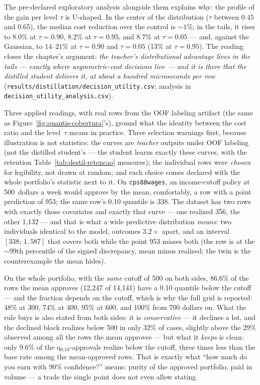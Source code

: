 The pre-declared exploratory analysis alongside them explains why: the
profile of the gain per level $\tau$ is U-shaped. In the center of
the distribution ($\tau$ between 0.45 and 0.65), the median cost
reduction over the control is ${\sim}1\%$; in the tails, it rises to
$8.0\%$ at $\tau{=}0.90$, $8.2\%$ at $\tau{=}0.95$, and $8.7\%$ at
$\tau{=}0.05$ --- and, against the Gaussian, to $14$--$21\%$ at
$\tau{=}0.90$ and $\tau{=}0.05$ (13\% at $\tau{=}0.95$). The reading
closes the chapter's argument: \emph{the teacher's distributional
advantage lives in the tails --- exactly where asymmetric-cost
decisions live --- and it is there that the distilled student
delivers it, at about a hundred microseconds per row}
(\texttt{results/\allowbreak distillation/\allowbreak decision\_\allowbreak utility.\allowbreak csv};
analysis in
\texttt{decision\_\allowbreak utility\_\allowbreak analysis.\allowbreak csv}).

Three applied readings, with real rows from the OOF labeling
artifact (the same as Figure~\ref{fig:quantis-cobertura}'s), ground
what the identity between the cost ratio and the level~$\tau$ means
in practice. Three selection warnings first, because illustration is
not statistics: the curves are \emph{teacher} outputs under OOF
labeling (not the distilled student's --- the student learns exactly
these curves, with the retention Table~\ref{tab:destil-retencao}
measures); the individual rows were \emph{chosen} for legibility,
not drawn at random; and each choice comes declared with the whole
portfolio's statistic next to it. On \texttt{cps88wages}, an
income-cutoff policy at 500~dollars a week would approve by the
mean, comfortably, a row with a point prediction of 953; the same
row's 0.10 quantile is 338. The dataset has two rows with exactly
those covariates and exactly that curve --- one realized 356, the
other 1{,}132 --- and that is what a wide predictive distribution
\emph{means}: two individuals identical to the model, outcomes
$3.2\times$ apart, and an interval $[338;\,1{,}587]$ that covers
both while the point 953 misses both (the row is at the
${\sim}99$th percentile of the signed discrepancy, mean minus
realized; the twin is the counterexample the mean hides).

On the whole portfolio, with the \emph{same} cutoff of 500 on both
sides, 86.6\% of the rows the mean approves (12{,}247 of 14{,}141)
have a 0.10 quantile below the cutoff --- and the fraction depends
on the cutoff, which is why the full grid is reported: 48\% at 300,
74\% at 400, 95\% at 600, and 100\% from 700 dollars on. What the
rule buys is also stated from both sides: it is \emph{conservative}
--- it declines a lot, and the declined block realizes below 500 in
only 32\% of cases, slightly above the 29\% observed among all the
rows the mean approves ---
but what it \emph{keeps} is clean: only 9.6\% of the
q$_{0.10}$-approvals realize below the cutoff, three times less
than the base rate among the mean-approved rows. That is exactly what ``how much do you earn with 90\%
confidence?'' means: purity of the approved portfolio, paid in
volume --- a trade the single point does not even allow stating.

